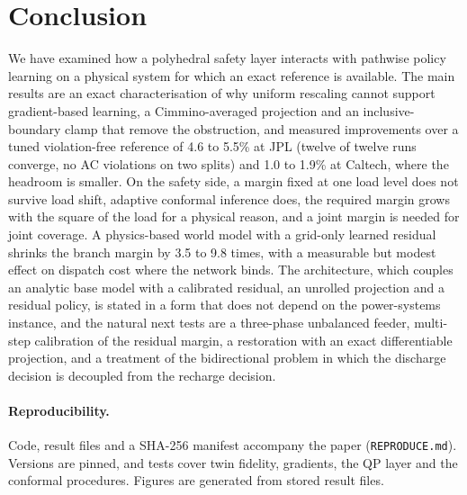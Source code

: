 \documentclass[11pt]{article}
\begin{document}
\section{Conclusion}\label{sec:concl}
We have examined how a polyhedral safety layer interacts with pathwise policy learning on a physical system for which an exact reference is available. The main results are an exact characterisation of why uniform rescaling cannot support gradient-based learning, a Cimmino-averaged projection and an inclusive-boundary clamp that remove the obstruction, and measured improvements over a tuned violation-free reference of 4.6 to 5.5\% at JPL (twelve of twelve runs converge, no AC violations on two splits) and 1.0 to 1.9\% at Caltech, where the headroom is smaller. On the safety side, a margin fixed at one load level does not survive load shift, adaptive conformal inference does, the required margin grows with the square of the load for a physical reason, and a joint margin is needed for joint coverage. A physics-based world model with a grid-only learned residual shrinks the branch margin by 3.5 to 9.8 times, with a measurable but modest effect on dispatch cost where the network binds. The architecture, which couples an analytic base model with a calibrated residual, an unrolled projection and a residual policy, is stated in a form that does not depend on the power-systems instance, and the natural next tests are a three-phase unbalanced feeder, multi-step calibration of the residual margin, a restoration with an exact differentiable projection, and a treatment of the bidirectional problem in which the discharge decision is decoupled from the recharge decision.

\paragraph{Reproducibility.} Code, result files and a SHA-256 manifest accompany the paper (\texttt{REPRODUCE.md}). Versions are pinned, and tests cover twin fidelity, gradients, the QP layer and the conformal procedures. Figures are generated from stored result files.

\newpage
\end{document}
